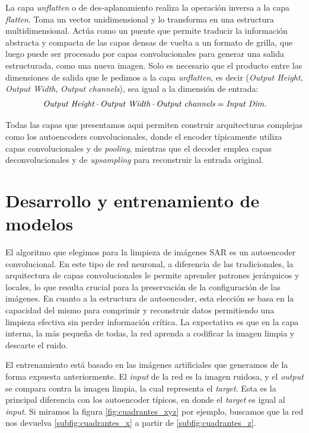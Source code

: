 La capa \emph{unflatten} o de des-aplanamiento realiza la operación inversa a la capa \emph{flatten}. Toma un vector unidimensional y lo transforma en una estructura multidimensional. Actúa como un puente que permite traducir la información abstracta y compacta de las capas densas de vuelta a un formato de grilla, que luego puede ser procesado por capas convolucionales para generar una salida estructurada, como una nueva imagen. Solo es necesario que el producto entre las dimensiones de salida que le pedimos a la capa \emph{unflatten}, es decir (\emph{Output Height}, \emph{Output Width}, \emph{Output channels}), sea igual a la dimensión de entrada:
\begin{equation}
    \emph{Output Height} \cdot \emph{Output Width} \cdot \emph{Output channels} = \emph{Input Dim.}
\end{equation}

\vspace{1cm}

Todas las capas que presentamos aqui permiten construir arquitecturas complejas como los autoencoders convolucionales, donde el encoder típicamente utiliza capas convolucionales y de \emph{pooling}, mientras que el decoder emplea capas deconvolucionales y de \emph{upsampling} para reconstruir la entrada original.

\section{Desarrollo y entrenamiento de modelos}

El algoritmo que elegimos para la limpieza de imágenes SAR es un autoencoder convolucional. En este tipo de red neuronal, a diferencia de las tradicionales, la arquitectura de capas convolucionales le permite aprender patrones jerárquicos y locales, lo que resulta crucial para la preservación de la configuración de las imágenes. En cuanto a la estructura de autoencoder, esta elección se basa en la capacidad del mismo para comprimir y reconstruir datos permitiendo una limpieza efectiva sin perder información crítica. La expectativa es que en la capa interna, la más pequeña de todas, la red aprenda a codificar la imagen limpia y descarte el ruido.

El entrenamiento está basado en las imágenes artificiales que generamos de la forma expuesta anteriormente. El \emph{input} de la red es la imagen ruidosa, y el \emph{output} se compara contra la imagen limpia, la cual representa el \emph{target}. Esta es la principal diferencia con los autoencoder típicos, en donde el \emph{target} es igual al \emph{input}. Si miramos la figura \ref{fig:cuadrantes_xyz} por ejemplo, buscamos que la red nos devuelva \ref{subfig:cuadrantes_x} a partir de \ref{subfig:cuadrantes_z}.

